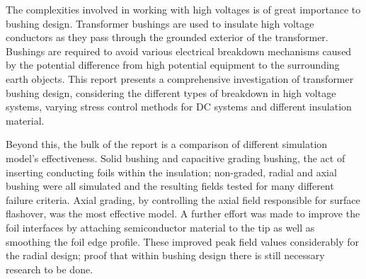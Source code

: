 The complexities involved in working with high voltages is of great importance to bushing design. Transformer bushings are used to insulate high voltage conductors as they pass through the grounded exterior of the transformer. Bushings are required to avoid various electrical breakdown mechanisms caused by the potential difference from high potential equipment to the surrounding earth objects. This report presents a comprehensive investigation of transformer bushing design, considering the different types of breakdown in high voltage systems, varying stress control methods for DC systems and different insulation material. 

Beyond this, the bulk of the report is a comparison of different simulation model’s effectiveness. Solid bushing and capacitive grading bushing, the act of inserting conducting foils within the insulation; non-graded, radial and axial bushing were all simulated and the resulting fields tested for many different failure criteria. Axial grading, by controlling the axial field responsible for surface flashover, was the most effective model. A further effort was made to improve the foil interfaces by attaching semiconductor material to the tip as well as smoothing the foil edge profile. These improved peak field values considerably for the radial design; proof that within bushing design there is still necessary research to be done.  
